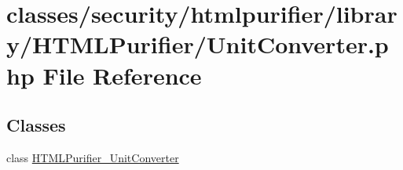 \hypertarget{UnitConverter_8php}{\section{classes/security/htmlpurifier/library/\+H\+T\+M\+L\+Purifier/\+Unit\+Converter.php File Reference}
\label{UnitConverter_8php}
}
\subsection*{Classes}
\begin{DoxyCompactItemize}
\item 
class \hyperlink{classHTMLPurifier__UnitConverter}{H\+T\+M\+L\+Purifier\+\_\+\+Unit\+Converter}
\end{DoxyCompactItemize}
